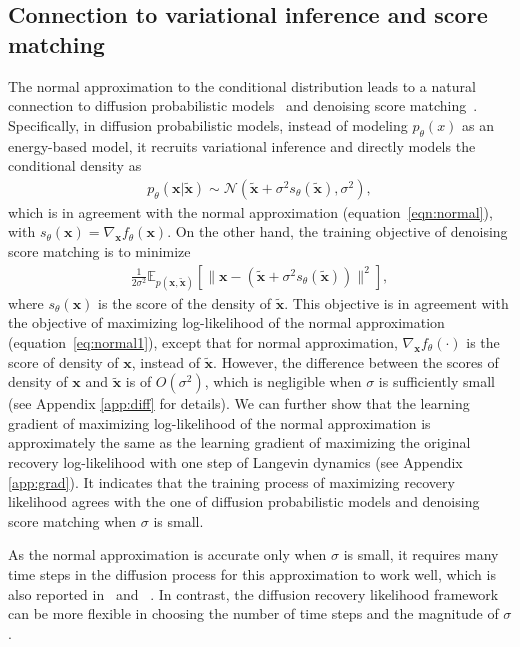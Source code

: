 \documentclass{article} \usepackage{iclr2021_conference,times}
\def\eqref#1{equation~\ref{#1}}
\def\rvx{{\mathbf{x}}}
\newcommand{\E}{\mathbb{E}}
\def\trvx{\tilde{\rvx}}
\begin{document}
\subsection{Connection to variational inference and score matching} \label{sect:connection}
The normal approximation to the conditional distribution leads to a natural connection to diffusion probabilistic models~\citep{sohl2015deep,ho2020denoising} and denoising score matching~\citep{vincent2011connection,song2019generative,song2020improved,saremi2018deep,saremi2019neural}. Specifically, in diffusion probabilistic models, instead of modeling $p_\theta(x)$ as an energy-based model, it recruits variational inference and directly models the conditional density as
\begin{eqnarray}
p_\theta(\rvx|\trvx) \sim  \mathcal{N}\left(\trvx + \sigma^2 s_\theta(\trvx), \sigma^2\right) ,
\end{eqnarray}
which is in agreement with the normal approximation (\eqref{eqn:normal}), with $s_\theta(\rvx) = \nabla_\rvx f_\theta(\rvx)$. On the other hand, the training objective of denoising score matching is to minimize
\begin{eqnarray}
	\frac{1}{2\sigma^2} \E_{p(\rvx, \trvx)}[\|\rvx - ( \trvx  + \sigma^2 s_\theta(\trvx))\|^2],
\end{eqnarray}
where $s_\theta(\rvx)$ is the score of the density of $\trvx$. This objective is in agreement with the objective of maximizing log-likelihood of the normal approximation (\eqref{eq:normal1}), except that for normal approximation, $\nabla_\rvx f_\theta(\cdot)$ is the score of density of $\rvx$, instead of $\trvx$. However, the difference between the scores of density of $\rvx$ and $\trvx$ is of $O(\sigma^2)$, which is negligible when $\sigma$ is sufficiently small (see Appendix \ref{app:diff} for details). We can further show that the learning gradient of maximizing log-likelihood of the normal approximation is approximately the same as the learning gradient of maximizing the original recovery log-likelihood with one step of Langevin dynamics (see Appendix \ref{app:grad}). It indicates that the training process of maximizing recovery likelihood agrees with the one of diffusion probabilistic models and denoising score matching when $\sigma$ is small. 

As the normal approximation is accurate only when $\sigma$ is small, it requires many time steps in the diffusion process for this approximation to work well, which is also reported in~\citet{ho2020denoising} and ~\citet{song2020improved}. In contrast, the diffusion recovery likelihood framework can be more flexible in choosing the number of time steps and the magnitude of $\sigma$.
\end{document}
